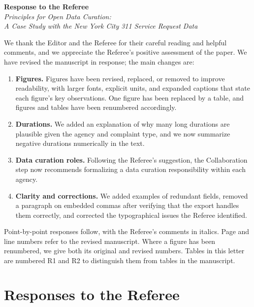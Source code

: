 \documentclass[11pt]{article}
\begin{document}
\begin{center}
{\Large\bfseries Response to the Referee}\\[0.5em]
{\large\itshape Principles for Open Data Curation:\\
A Case Study with the New York City 311 Service Request Data}
\end{center}

\bigskip

We thank the Editor and the Referee for their careful reading and
helpful comments, and we appreciate the Referee's positive assessment
of the paper. We have revised the manuscript in response; the main
changes are:

\begin{enumerate}
\item \textbf{Figures.} Figures have been revised, replaced, or
  removed to improve readability, with larger fonts, explicit units,
  and expanded captions that state each figure's key observations.
  One figure has been replaced by a table, and figures and tables have
  been renumbered accordingly.
\item \textbf{Durations.} We added an explanation of why many long
  durations are plausible given the agency and complaint type, and we
  now summarize negative durations numerically in the text.
\item \textbf{Data curation roles.} Following the Referee's
  suggestion, the Collaboration step now recommends formalizing a data
  curation responsibility within each agency.
\item \textbf{Clarity and corrections.} We added examples of redundant
  fields, removed a paragraph on embedded commas after verifying that
  the export handles them correctly, and corrected the typographical
  issues the Referee identified.
\end{enumerate}

Point-by-point responses follow, with the Referee's comments in
italics. Page and line numbers refer to the revised manuscript. Where
a figure has been renumbered, we give both its original and revised
numbers. Tables in this letter are numbered R1 and R2 to distinguish
them from tables in the manuscript.

\section*{Responses to the Referee}
\end{document}
